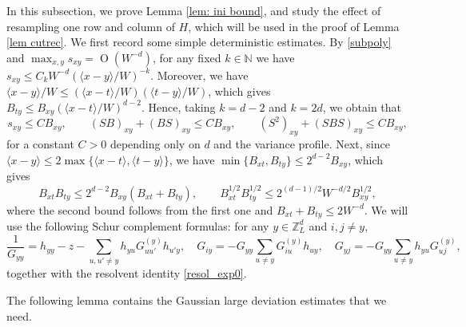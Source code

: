 \documentclass{article}
\newcommand{\1}{\mathds{1}}
\numberwithin{equation}{section}
\newcommand{\be}{\begin{equation}}
\newcommand{\ee}{\end{equation}}
\renewcommand{\leq}{\leqslant}
\renewcommand{\le}{\leq}
\newcommand{\N}{\mathbb{N}}
\newcommand{\Z}{\mathbb{Z}}
\DeclareMathOperator{\OO}{O}
\theoremstyle{plain} %
\theoremstyle{remark}
\begin{document}
In this subsection, we prove Lemma \ref{lem: ini bound}, and study the effect of resampling one row and column of $H$, which will be used in the proof of Lemma \ref{lem cutrec}. We first record some simple deterministic estimates. By \eqref{subpoly} and $\max_{x,y}s_{xy}=\OO(W^{-d})$, for any fixed $k\in \N$ we have $s_{xy}\le C_kW^{-d}(\langle x-y\rangle/W)^{-k}$. Moreover, we have $\langle x-y\rangle/W\le (\langle x-t\rangle/W)(\langle t-y\rangle/W)$, which gives $B_{ty}\le B_{xy}(\langle x-t\rangle/W)^{d-2}$. Hence, taking $k=d-2$ and $k=2d$, we obtain that
\be\label{SB bounds}
s_{xy}\le CB_{xy},\qquad (SB)_{xy}+(BS)_{xy}\le CB_{xy},\qquad (S^2)_{xy}+(SBS)_{xy}\le CB_{xy},
\ee
for a constant $C>0$ depending only on $d$ and the variance profile. Next, since $\langle x-y\rangle\le 2\max\{\langle x-t\rangle,\langle t-y\rangle\}$, we have $\min\{B_{xt},B_{ty}\}\le 2^{d-2}B_{xy}$, which gives
\be\label{B prod}
B_{xt}B_{ty}\le 2^{d-2}B_{xy}\left(B_{xt}+B_{ty}\right),\qquad B_{xt}^{1/2}B_{ty}^{1/2}\le 2^{(d-1)/2}W^{-d/2}B_{xy}^{1/2},
\ee
where the second bound follows from the first one and $B_{xt}+B_{ty}\le 2W^{-d}$. We will use the following Schur complement formulas: for any $y\in\Z_L^d$ and $i,j\ne y$,
\be\label{schur}
\frac{1}{G_{yy}}=h_{yy}-z-\sum_{u,u'\ne y}h_{yu}G^{(y)}_{uu'}h_{u'y},\quad G_{iy}=-G_{yy}\sum_{u\ne y}G^{(y)}_{iu}h_{uy},\quad G_{yj}=-G_{yy}\sum_{u\ne y}h_{yu}G^{(y)}_{uj},
\ee
together with the resolvent identity \eqref{resol_exp0}.

The following lemma contains the Gaussian large deviation estimates that we need.
\end{document}
